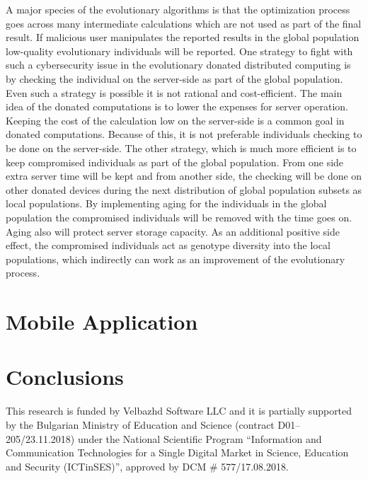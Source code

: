 \documentclass[graybox]{svmult}
\begin{document}
A major species of the evolutionary algorithms is that the optimization process goes across many intermediate calculations which are not used as part of the final result. If malicious user manipulates the reported results in the global population low-quality evolutionary individuals will be reported. One strategy to fight with such a cybersecurity issue in the evolutionary donated distributed computing is by checking the individual on the server-side as part of the global population. Even such a strategy is possible it is not rational and cost-efficient. The main idea of the donated computations is to lower the expenses for server operation. Keeping the cost of the calculation low on the server-side is a common goal in donated computations. Because of this, it is not preferable individuals checking to be done on the server-side. The other strategy, which is much more efficient is to keep compromised individuals as part of the global population. From one side extra server time will be kept and from another side, the checking will be done on other donated devices during the next distribution of global population subsets as local populations. By implementing aging for the individuals in the global population the compromised individuals will be removed with the time goes on. Aging also will protect server storage capacity. As an additional positive side effect, the compromised individuals act as genotype diversity into the local populations, which indirectly can work as an improvement of the evolutionary process. 

\section{Mobile Application}
\label{sec:03}

\section{Conclusions}
\label{sec:04}

\begin{acknowledgement}
This research is funded by Velbazhd Software LLC and it is partially supported by the Bulgarian Ministry of Education and Science (contract D01–205/23.11.2018) under the National Scientific Program ``Information and Communication Technologies for a Single Digital Market in Science, Education and Security (ICTinSES)'', approved by DCM \# 577/17.08.2018.
\end{acknowledgement}


\end{document}
